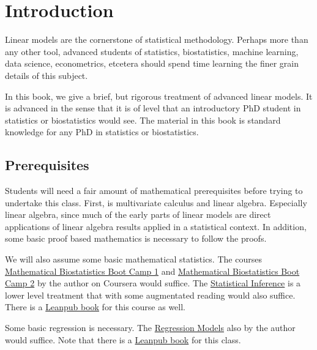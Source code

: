\chapter{Introduction}


Linear models are the cornerstone of statistical methodology.
Perhaps more than any other tool, advanced students of
statistics, biostatistics, machine learning, data science,
econometrics, etcetera should spend time learning the
finer grain details of this subject.

In this book, we give a brief, but rigorous 
treatment of advanced linear models.
It is advanced in the sense that it is of level that an
introductory PhD student in statistics or biostatistics
would see. The material in this book is standard
knowledge for any PhD in statistics or biostatistics. 

\section{Prerequisites}

Students will need a fair amount of mathematical prerequisites
before trying to undertake this class. First, is multivariate
calculus and linear algebra. Especially linear algebra, since
much of the early parts of linear models are direct applications
of linear algebra results applied in a statistical context.
In addition, some basic proof based mathematics is necessary
to follow the proofs.

We will also assume some basic mathematical statistics. The
courses \href{https://www.coursera.org/course/biostats}{Mathematical Biostatistics Boot Camp 1}
and \href{https://www.coursera.org/course/biostats2}{Mathematical Biostatistics Boot Camp 2}
by the author on Coursera would suffice. The \href{https://www.coursera.org/course/statinference}{Statistical Inference} is a lower level
treatment that with some augmentated reading would also suffice.
There is a \href{https://leanpub.com/LittleInferenceBook}{Leanpub book} for
this course as well.

Some basic regression is necessary. The \href{https://www.coursera.org/course/regmods}{Regression Models}
also by the author would suffice. Note that there is a
\href{https://leanpub.com/regmods/}{Leanpub book} for this class. 
